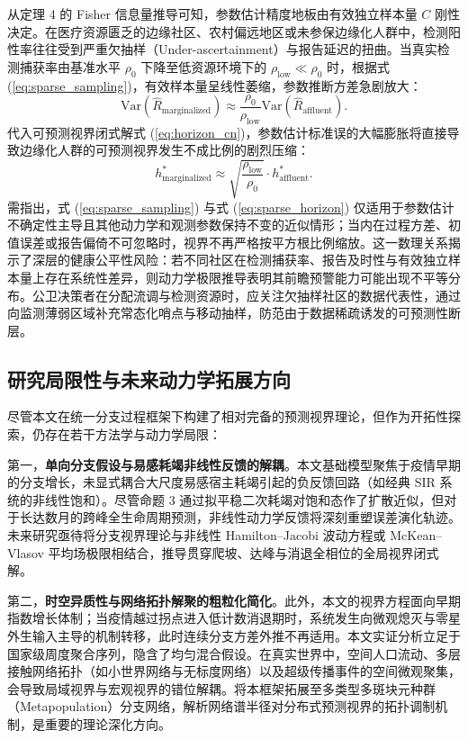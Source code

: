 \documentclass[11pt,a4paper]{article}
\theoremstyle{plain}
\theoremstyle{definition}
\begin{document}
从定理 4 的 Fisher 信息量推导可知，参数估计精度地板由有效独立样本量 $C$ 刚性决定。在医疗资源匮乏的边缘社区、农村偏远地区或未参保边缘化人群中，检测阳性率往往受到严重欠抽样（Under-ascertainment）与报告延迟的扭曲。当真实检测捕获率由基准水平 $\rho_0$ 下降至低资源环境下的 $\rho_{\text{low}} \ll \rho_0$ 时，根据式 (\ref{eq:sparse_sampling})，有效样本量呈线性萎缩，参数推断方差急剧放大：
\begin{equation}
\text{Var}(\hat{R}_{\text{marginalized}}) \approx \frac{\rho_0}{\rho_{\text{low}}} \text{Var}(\hat{R}_{\text{affluent}}).
\end{equation}
代入可预测视界闭式解式 (\ref{eq:horizon_cn})，参数估计标准误的大幅膨胀将直接导致边缘化人群的可预测视界发生不成比例的剧烈压缩：
\begin{equation}
h^*_{\text{marginalized}} \approx \sqrt{\frac{\rho_{\text{low}}}{\rho_0}} \cdot h^*_{\text{affluent}}.
\label{eq:sparse_horizon}
\end{equation}
需指出，式 (\ref{eq:sparse_sampling}) 与式 (\ref{eq:sparse_horizon}) 仅适用于参数估计不确定性主导且其他动力学和观测参数保持不变的近似情形；当内在过程方差、初值误差或报告偏倚不可忽略时，视界不再严格按平方根比例缩放。这一数理关系揭示了深层的健康公平性风险：若不同社区在检测捕获率、报告及时性与有效独立样本量上存在系统性差异，则动力学极限推导表明其前瞻预警能力可能出现不平等分布。公卫决策者在分配流调与检测资源时，应关注欠抽样社区的数据代表性，通过向监测薄弱区域补充常态化哨点与移动抽样，防范由于数据稀疏诱发的可预测性断层。

\subsection{研究局限性与未来动力学拓展方向}

尽管本文在统一分支过程框架下构建了相对完备的预测视界理论，但作为开拓性探索，仍存在若干方法学与动力学局限：

第一，\textbf{单向分支假设与易感耗竭非线性反馈的解耦}。本文基础模型聚焦于疫情早期的分支增长，未显式耦合大尺度易感宿主耗竭引起的负反馈回路（如经典 SIR 系统的非线性饱和）。尽管命题 3 通过拟平稳二次耗竭对饱和态作了扩散近似，但对于长达数月的跨峰全生命周期预测，非线性动力学反馈将深刻重塑误差演化轨迹。未来研究亟待将分支视界理论与非线性 Hamilton--Jacobi 波动方程或 McKean--Vlasov 平均场极限相结合，推导贯穿爬坡、达峰与消退全相位的全局视界闭式解。

第二，\textbf{时空异质性与网络拓扑解聚的粗粒化简化}。此外，本文的视界方程面向早期指数增长体制；当疫情越过拐点进入低计数消退期时，系统发生向微观熄灭与零星外生输入主导的机制转移\citep{parag2026threshold}，此时连续分支方差外推不再适用。本文实证分析立足于国家级周度聚合序列，隐含了均匀混合假设。在真实世界中，空间人口流动、多层接触网络拓扑（如小世界网络与无标度网络）以及超级传播事件的空间微观聚集，会导致局域视界与宏观视界的错位解耦。将本框架拓展至多类型多斑块元种群（Metapopulation）分支网络，解析网络谱半径对分布式预测视界的拓扑调制机制，是重要的理论深化方向。
\end{document}
